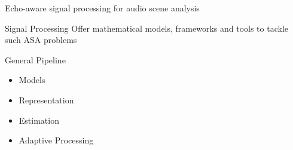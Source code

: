 \begin{frame}{Echo-aware \alert{signal processing} for audio scene analysis}

    \begin{mydefblock}{Signal Processing}
        Offer mathematical models, frameworks and tools to tackle such ASA problems
    \end{mydefblock}




    \begin{block}{General Pipeline}
        \begin{itemize}
            \item Models
            \item Representation
            \item Estimation
            \item Adaptive Processing
        \end{itemize}
    \end{block}
\end{frame}

